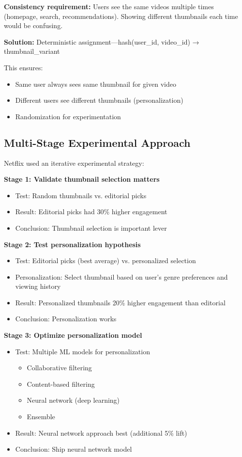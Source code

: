 \textbf{Consistency requirement:} Users see the same videos multiple times (homepage, search, recommendations). Showing different thumbnails each time would be confusing.

\textbf{Solution:} Deterministic assignment—hash(user\_id, video\_id) → thumbnail\_variant

This ensures:
\begin{itemize}
    \item Same user always sees same thumbnail for given video
    \item Different users see different thumbnails (personalization)
    \item Randomization for experimentation
\end{itemize}

\subsection{Multi-Stage Experimental Approach}

Netflix used an iterative experimental strategy:

\textbf{Stage 1: Validate thumbnail selection matters}

\begin{itemize}
    \item Test: Random thumbnails vs. editorial picks
    \item Result: Editorial picks had 30\% higher engagement
    \item Conclusion: Thumbnail selection is important lever
\end{itemize}

\textbf{Stage 2: Test personalization hypothesis}

\begin{itemize}
    \item Test: Editorial picks (best average) vs. personalized selection
    \item Personalization: Select thumbnail based on user's genre preferences and viewing history
    \item Result: Personalized thumbnails 20\% higher engagement than editorial
    \item Conclusion: Personalization works
\end{itemize}

\textbf{Stage 3: Optimize personalization model}

\begin{itemize}
    \item Test: Multiple ML models for personalization
    \begin{itemize}
        \item Collaborative filtering
        \item Content-based filtering
        \item Neural network (deep learning)
        \item Ensemble
    \end{itemize}
    \item Result: Neural network approach best (additional 5\% lift)
    \item Conclusion: Ship neural network model
\end{itemize}

